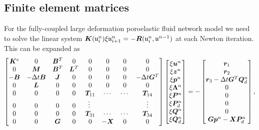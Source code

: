 \subsection{Finite element matrices}
\label{sec:fem_appendix}
For the fully-coupled large deformation poroelastic fluid network model we need to solve the linear system $\boldsymbol{K}(\mathfrak{u}_{i}^{n}) \xi \mathfrak{u}_{i+1}^{n} = - \boldsymbol{R}(\mathfrak{u}_{i}^{n},\mathfrak{u}^{n-1})$ at each Newton iteration. This can be expanded as
%
 \begin{equation*}
 \begin{bmatrix}
   \boldsymbol{K}^{e} & 0 & \boldsymbol{B}^{T} & 0  & 0 & 0 & 0&  0\\
  0 & \boldsymbol{M} & \boldsymbol{B}^{T} & \boldsymbol{L}^{T}  & 0& 0 & 0&  0\\
 -  \boldsymbol{B} & -\Delta t \boldsymbol{B} & \boldsymbol{J} & 0 & 0 & 0&  0 & -\Delta t \boldsymbol{G}^{T} \\
 0 & \boldsymbol{L} & 0 & 0 & 0 &  0 & 0 &  0\\
 0 & 0 & 0& 0 &  \boldsymbol{T}_{11}   &   \cdots & \cdots& \boldsymbol{T}_{14} \\
 0 & 0 & 0& 0 & \vdots\  & &     & \vdots\\
0 & 0 & 0& 0 & \boldsymbol{T}_{31}  & \cdots &\cdots & \boldsymbol{T}_{34}\\
 0 & 0 & \boldsymbol{G} & 0 & 0 &  -\boldsymbol{X}  &  0&  0 \\
 \end{bmatrix}
 \begin{bmatrix}
  \xi\boldsymbol{u}^{n} \\
  \xi\boldsymbol{z}^{n} \\
 \xi\boldsymbol{p}^{n}  \\
\xi\boldsymbol{\Lambda}^{n}  \\
\xi\boldsymbol{P}^{n}  \\
\xi\boldsymbol{P}^{n}_{d}  \\
\xi\boldsymbol{Q}^{n}  \\
\xi\boldsymbol{Q}_{d}^{n}  \\
 \end{bmatrix}=-
 \begin{bmatrix}
  \boldsymbol{r}_{1} \\
  \boldsymbol{r}_{2} \\
 \boldsymbol{r}_{3} -\Delta t \boldsymbol{G}^{T} \boldsymbol{Q}_{d}^{n} \\
0 \\
0 \\
0 \\
0 \\
\boldsymbol{G} \boldsymbol{p}^{n} - \boldsymbol{X} \boldsymbol{P}^{n}_{d}
 \end{bmatrix},
 \end{equation*}
